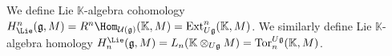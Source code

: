 \begin{definition}\label{3.2.9}
	We define Lie $\mathbb{K} $-algebra cohomology $H^n_{\Lie }(\mathfrak{g} ,M)=R^n \Hom_{\mathcal{U} (\mathfrak{g} )} (\mathbb{K} ,M) = \operatorname{Ext}^n_{U\mathfrak{g} } (\mathbb{K} ,M)$. We similarly define Lie $\mathbb{K} $-algebra homology $H_n^{\Lie }(\mathfrak{g} ,M)=L_n(\mathbb{K} \otimes_{U\mathfrak{g} } M)=\operatorname{Tor}_n^{U\mathfrak{g} } (\mathbb{K} ,M)$.
\end{definition}

